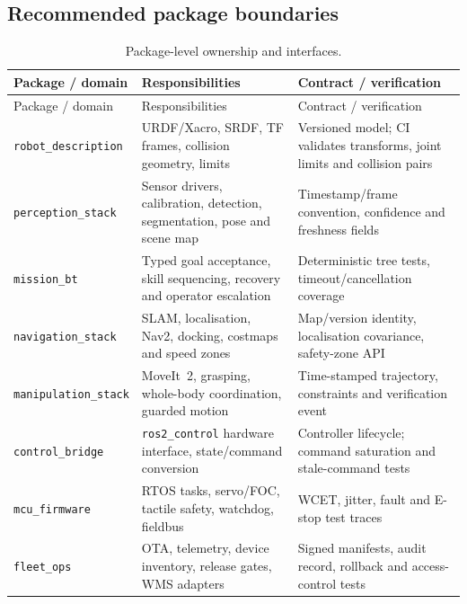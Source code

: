\documentclass[10pt,a4paper]{article}
\begin{document}
\subsection{Recommended package boundaries}
\begin{longtable}{@{}p{}p{}p{}@{}}
\caption{Package-level ownership and interfaces.}\\
\toprule
Package / domain & Responsibilities & Contract / verification \\
\midrule
\endfirsthead
\toprule Package / domain & Responsibilities & Contract / verification \\
\midrule\endhead
\texttt{robot\_description} & URDF/Xacro, SRDF, TF frames, collision geometry, limits & Versioned model; CI validates transforms, joint limits and collision pairs \\
\texttt{perception\_stack} & Sensor drivers, calibration, detection, segmentation, pose and scene map & Timestamp/frame convention, confidence and freshness fields \\
\texttt{mission\_bt} & Typed goal acceptance, skill sequencing, recovery and operator escalation & Deterministic tree tests, timeout/cancellation coverage \\
\texttt{navigation\_stack} & SLAM, localisation, Nav2, docking, costmaps and speed zones & Map/version identity, localisation covariance, safety-zone API \\
\texttt{manipulation\_stack} & MoveIt~2, grasping, whole-body coordination, guarded motion & Time-stamped trajectory, constraints and verification event \\
\texttt{control\_bridge} & \texttt{ros2\_control} hardware interface, state/command conversion & Controller lifecycle; command saturation and stale-command tests \\
\texttt{mcu\_firmware} & RTOS tasks, servo/FOC, tactile safety, watchdog, fieldbus & WCET, jitter, fault and E-stop test traces \\
\texttt{fleet\_ops} & OTA, telemetry, device inventory, release gates, WMS adapters & Signed manifests, audit record, rollback and access-control tests \\
\bottomrule
\end{longtable}
\end{document}
